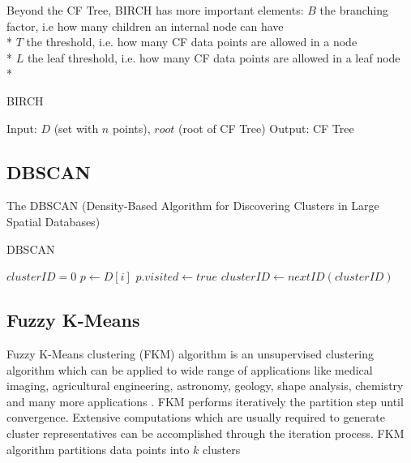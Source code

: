 \documentclass[conference, 10pt]{IEEEtran}
\begin{document}
Beyond the CF Tree, BIRCH has more important elements:\vspace{1 mm}
$B$ the branching factor, i.e how many children an internal node can have\\*
$T$ the threshold, i.e. how many CF data points are allowed in a node\\*
$L$ the leaf threshold, i.e. how many CF data points are allowed in a leaf node\\*

\begin{algorithm}
\caption{BIRCH}
\begin{algorithmic}[1]
    \State Input: $D$ (set with $n$ points), $root$ (root of CF Tree)
    \State Output: CF Tree
        \Else
      \EndIf
    \EndFor
  \EndProcedure
\end{algorithmic}
\end{algorithm}

\subsection{DBSCAN}
The DBSCAN (Density-Based Algorithm for Discovering Clusters in Large Spatial Databases)
\begin{algorithm}
\caption{DBSCAN}
\begin{algorithmic}[1]
  \State $clusterID = 0$
      \State $p \gets D[i]$
      \State $p.visited \gets true$    
          \State $clusterID \gets nextID(clusterID)$
        \EndIf
      \EndIf
  \EndFor
\EndProcedure
\Statex
{}
\EndProcedure
\end{algorithmic}
\end{algorithm}

\subsection{Fuzzy K-Means}
Fuzzy K-Means clustering (FKM) algorithm is an unsupervised clustering algorithm which can be
applied to wide range of applications like medical imaging, agricultural engineering, astronomy,
geology, shape analysis, chemistry and many more applications \cite{pattern}. FKM performs iteratively the partition step until convergence. Extensive computations which are usually required to generate cluster representatives can be accomplished through the iteration process. FKM algorithm partitions data points into $k$ clusters
\end{document}
